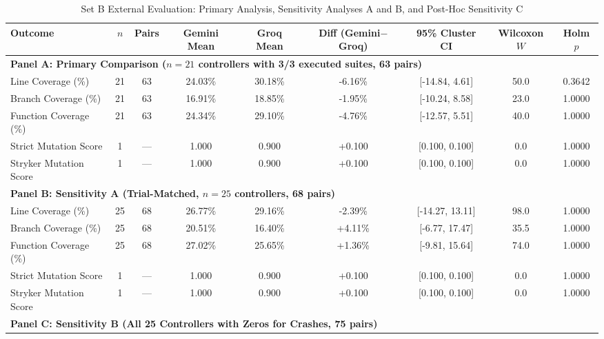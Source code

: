 \begin{table}[htbp]
\centering
\caption{Set B External Evaluation: Primary Analysis, Sensitivity Analyses A and B, and Post-Hoc Sensitivity C}
\label{tab:setb_comparison}
\begin{tabular}{lcccccccc}
\toprule
\textbf{Outcome} & \textbf{$n$} & \textbf{Pairs} & \textbf{Gemini Mean} & \textbf{Groq Mean} & \textbf{Diff (Gemini$-$Groq)} & \textbf{95\% Cluster CI} & \textbf{Wilcoxon $W$} & \textbf{Holm $p$} \\
\midrule
\multicolumn{9}{l}{\textbf{Panel A: Primary Comparison ($n=21$ controllers with 3/3 executed suites, 63 pairs)}} \\
\midrule
Line Coverage (\%) & 21 & 63 & 24.03\% & 30.18\% & -6.16\% & [-14.84, 4.61] & 50.0 & 0.3642 \\
Branch Coverage (\%) & 21 & 63 & 16.91\% & 18.85\% & -1.95\% & [-10.24, 8.58] & 23.0 & 1.0000 \\
Function Coverage (\%) & 21 & 63 & 24.34\% & 29.10\% & -4.76\% & [-12.57, 5.51] & 40.0 & 1.0000 \\
Strict Mutation Score & 1 & --- & 1.000 & 0.900 & +0.100 & [0.100, 0.100] & 0.0 & 1.0000 \\
Stryker Mutation Score & 1 & --- & 1.000 & 0.900 & +0.100 & [0.100, 0.100] & 0.0 & 1.0000 \\
\midrule
\multicolumn{9}{l}{\textbf{Panel B: Sensitivity A (Trial-Matched, $n=25$ controllers, 68 pairs)}} \\
\midrule
Line Coverage (\%) & 25 & 68 & 26.77\% & 29.16\% & -2.39\% & [-14.27, 13.11] & 98.0 & 1.0000 \\
Branch Coverage (\%) & 25 & 68 & 20.51\% & 16.40\% & +4.11\% & [-6.77, 17.47] & 35.5 & 1.0000 \\
Function Coverage (\%) & 25 & 68 & 27.02\% & 25.65\% & +1.36\% & [-9.81, 15.64] & 74.0 & 1.0000 \\
Strict Mutation Score & 1 & --- & 1.000 & 0.900 & +0.100 & [0.100, 0.100] & 0.0 & 1.0000 \\
Stryker Mutation Score & 1 & --- & 1.000 & 0.900 & +0.100 & [0.100, 0.100] & 0.0 & 1.0000 \\
\midrule
\multicolumn{9}{l}{\textbf{Panel C: Sensitivity B (All 25 Controllers with Zeros for Crashes, 75 pairs)}} \\

\end{tabular}
\end{table}
